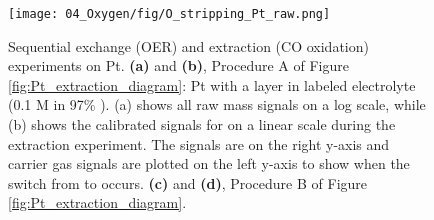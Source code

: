 \begin{figure}[h!]
	\centering
	\texttt{[image: 04\_Oxygen/fig/O\_stripping\_Pt\_raw.png]}
	\caption{
		Sequential exchange (OER) and extraction (CO oxidation) experiments on Pt. \textbf{(a)} and \textbf{(b)}, Procedure A of Figure \ref{fig:Pt_extraction_diagram}: Pt with a  layer in labeled electrolyte (0.1 M  in 97\% ). (a) shows all raw mass signals on a log scale, while (b) shows the calibrated signals for  on a linear scale during the extraction experiment. The  signals are on the right y-axis and carrier gas signals are plotted on the left y-axis to show when the switch from  to  occurs.
		\textbf{(c)} and \textbf{(d)}, Procedure B of Figure \ref{fig:Pt_extraction_diagram}.
	}
	\label{fig:Pt_extraction_raw}
\end{figure}

